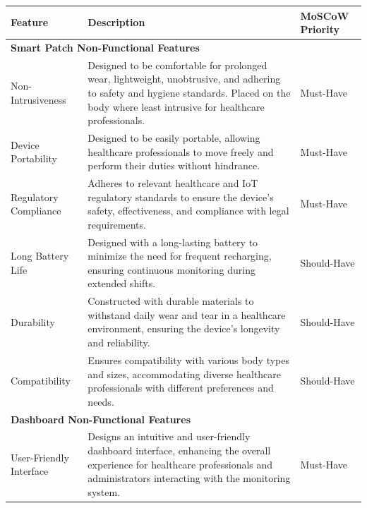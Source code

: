 \begin{table}[h!]
    \centering
    \begin{tabularx}{\textwidth}{|p{3cm}|X|p{2cm}|}
        \hline
        \textbf{Feature}
        & \textbf{Description}
        & \textbf{MoSCoW Priority} \\ \hline
        
        \multicolumn{3}{|l|}{\textbf{Smart Patch Non-Functional Features}} \\ \hline

        Non-Intrusiveness
        & Designed to be comfortable for prolonged wear, lightweight, unobtrusive, and adhering to safety and hygiene standards. Placed on the body where least intrusive for healthcare professionals.
        & Must-Have \\ \hline

        Device Portability
        & Designed to be easily portable, allowing healthcare professionals to move freely and perform their duties without hindrance.
        & Must-Have \\ \hline

        Regulatory Compliance
        & Adheres to relevant healthcare and IoT regulatory standards to ensure the device's safety, effectiveness, and compliance with legal requirements.
        & Must-Have \\ \hline

        Long Battery Life
        & Designed with a long-lasting battery to minimize the need for frequent recharging, ensuring continuous monitoring during extended shifts.
        & Should-Have \\ \hline

        Durability
        & Constructed with durable materials to withstand daily wear and tear in a healthcare environment, ensuring the device's longevity and reliability.
        & Should-Have \\ \hline

        Compatibility
        & Ensures compatibility with various body types and sizes, accommodating diverse healthcare professionals with different preferences and needs.
        & Should-Have \\ \hline

        \multicolumn{3}{|l|}{\textbf{Dashboard Non-Functional Features}} \\ \hline

        User-Friendly Interface
        & Designs an intuitive and user-friendly dashboard interface, enhancing the overall experience for healthcare professionals and administrators interacting with the monitoring system.
        & Must-Have \\ \hline


\end{tabularx}
\end{table}
